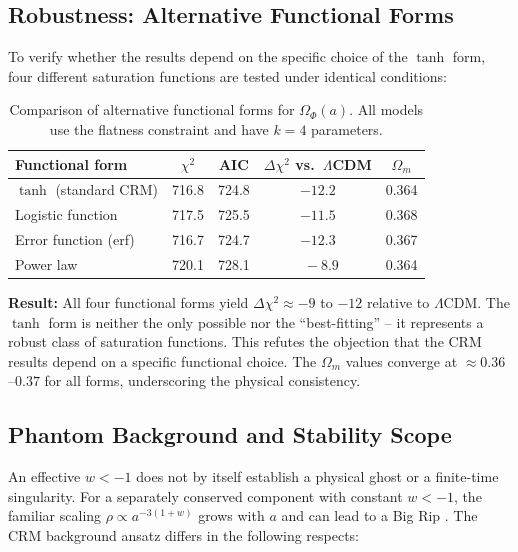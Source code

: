 \documentclass[aps,prd,twocolumn,superscriptaddress,nofootinbib]{revtex4-2}
\begin{document}
\subsection{Robustness: Alternative Functional Forms}
\label{subsec:funcforms}

To verify whether the results depend on the specific choice of the $\tanh$ form, four different saturation functions are tested under identical conditions:

\begin{table}[htbp]
\centering
\caption{Comparison of alternative functional forms for $\Omega_\Phi(a)$. All models use the flatness constraint and have $k=4$ parameters.}
\label{tab:funcforms}
\begin{tabular}{lcccc}
\toprule
\textbf{Functional form} & $\chi^2$ & AIC & $\Delta\chi^2$ vs.\ $\Lambda$CDM & $\Omega_m$ \\
\midrule
$\tanh$ (standard CRM) & 716.8 & 724.8 & $-12.2$ & 0.364 \\
Logistic function & 717.5 & 725.5 & $-11.5$ & 0.368 \\
Error function (erf) & 716.7 & 724.7 & $-12.3$ & 0.367 \\
Power law & 720.1 & 728.1 & $\phantom{0}-8.9$ & 0.364 \\
\bottomrule
\end{tabular}
\end{table}

\textbf{Result:} All four functional forms yield $\Delta\chi^2 \approx -9$ to $-12$ relative to $\Lambda$CDM. The $\tanh$ form is neither the only possible nor the ``best-fitting'' -- it represents a robust class of saturation functions. This refutes the objection that the CRM results depend on a specific functional choice. The $\Omega_m$ values converge at $\approx 0.36$--$0.37$ for all forms, underscoring the physical consistency.


\subsection{Phantom Background and Stability Scope}
\label{subsec:phantom}

An effective $w<-1$ does not by itself establish a physical ghost or a finite-time singularity. For a separately conserved component with constant $w<-1$, the familiar scaling $\rho\propto a^{-3(1+w)}$ grows with $a$ and can lead to a Big Rip \cite{Caldwell1998}. The CRM background ansatz differs in the following respects:
\end{document}
